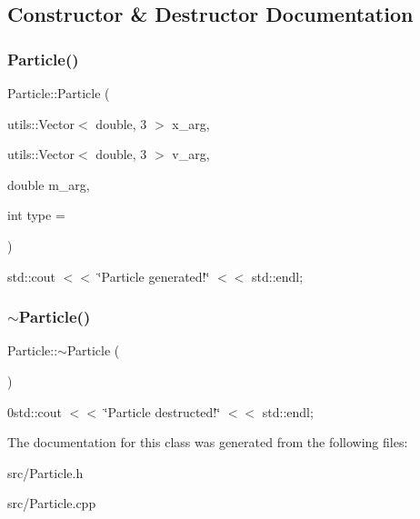 \subsection{Constructor \& Destructor Documentation}
\mbox{\label{class_particle_a5a5b07aa732c302b45e90c12723f2b27}} 
\subsubsection{\texorpdfstring{Particle()}{Particle()}}
{\footnotesize\ttfamily Particle\+::\+Particle (\begin{DoxyParamCaption}\item[{utils\+::\+Vector$<$ double, 3 $>$}]{x\+\_\+arg,  }\item[{utils\+::\+Vector$<$ double, 3 $>$}]{v\+\_\+arg,  }\item[{double}]{m\+\_\+arg,  }\item[{int}]{type = {} }\end{DoxyParamCaption})}

std\+::cout $<$$<$ \char`\"{}\+Particle generated!\char`\"{} $<$$<$ std\+::endl; \mbox{\label{class_particle_ad030d0fe7b88cf81744b127c99244ff4}} 
\subsubsection{\texorpdfstring{$\sim$\+Particle()}{~Particle()}}
{\footnotesize\ttfamily Particle\+::$\sim$\+Particle (\begin{DoxyParamCaption}{ }\end{DoxyParamCaption})\hspace{0.3cm}{\ttfamily [virtual]}}

0std\+::cout $<$$<$ \char`\"{}\+Particle destructed!\char`\"{} $<$$<$ std\+::endl; 

The documentation for this class was generated from the following files\+:\begin{DoxyCompactItemize}
\item 
src/Particle.\+h\item 
src/Particle.\+cpp\end{DoxyCompactItemize}
